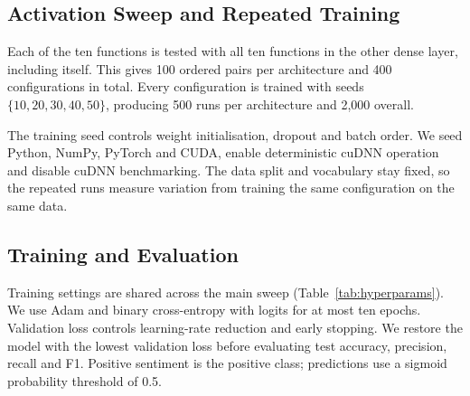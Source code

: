 \documentclass[conference,a4paper]{IEEEtran}
\begin{document}
\subsection{Activation Sweep and Repeated Training}
\label{sec:replication}

Each of the ten functions is tested with all ten functions
in the other dense layer, including itself. This gives
100 ordered pairs per architecture and 400 configurations
in total. Every configuration is trained with seeds
$\{10,20,30,40,50\}$, producing 500 runs per architecture
and 2{,}000 overall.

The training seed controls weight initialisation, dropout
and batch order. We seed Python, NumPy, PyTorch and CUDA,
enable deterministic cuDNN operation and disable cuDNN
benchmarking. The data split and vocabulary stay fixed,
so the repeated runs measure variation from training the
same configuration on the same data.

\subsection{Training and Evaluation}

Training settings are shared across the main sweep
(Table~\ref{tab:hyperparams}). We use Adam and binary
cross-entropy with logits for at most ten epochs.
Validation loss controls learning-rate reduction and early
stopping. We restore the model with the lowest validation
loss before evaluating test accuracy, precision, recall and
F1. Positive sentiment is the positive class; predictions
use a sigmoid probability threshold of 0.5.
\end{document}
